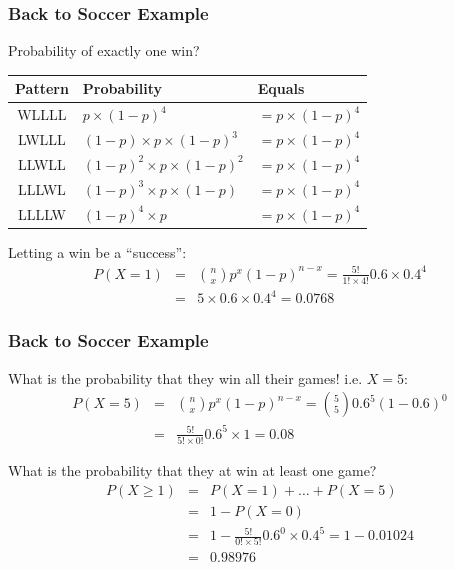 \documentclass[handout]{beamer}
\newcommand{\blue}[1]{\textcolor{blue2}{#1}}
\begin{document}
\begin{frame}
\frametitle{Back to Soccer Example}
Probability of exactly one win?

\begin{center}
\begin{tabular}{c|ll}
Pattern & Probability & Equals\\
\hline
\blue{WLLLL} & $p \times (1-p)^4$ & $=p\times(1-p)^4$\\
\blue{LWLLL} & $(1-p) \times p \times (1-p)^3$ & $=p\times(1-p)^4$\\
\blue{LLWLL} & $(1-p)^2 \times p \times (1-p)^2$& $=p\times(1-p)^4$\\
\blue{LLLWL} & $(1-p)^3 \times p \times (1-p)$& $=p\times(1-p)^4$\\
\blue{LLLLW} & $(1-p)^4 \times p$& $=p\times(1-p)^4$\\
\end{tabular} 
\end{center}

%
%
\pause Letting a win be a ``success'':
\begin{eqnarray*}
P(X=1) &=& {n \choose x} p^x (1-p)^{n-x} = \frac{5!}{1!\times4!} 0.6 \times 0.4^4\\
&=& 5 \times  0.6 \times 0.4^4 = 0.0768
\end{eqnarray*}

\end{frame}


\begin{frame}
\frametitle{Back to Soccer Example}
%
%
What is the probability that they win all their games!  i.e. $X=5$:
\pause \begin{eqnarray*}
P(X=5) &=& {n \choose x} p^x (1-p)^{n-x} = {5 \choose 5} 0.6^5 (1-0.6)^{0}\\
&=& \frac{5!}{5!\times 0!} 0.6^5 \times 1 = 0.08
\end{eqnarray*}

\vspace{0.75cm}

\pause What is the probability that they at win at least one game?
\pause \begin{eqnarray*}
P(X\geq 1) &=& P(X=1) + \ldots + P(X=5) \\
&=& 1 - P(X=0)\\
&=& 1 -  \frac{5!}{0!\times 5!} 0.6^0 \times 0.4^5 = 1 - 0.01024\\
&=& 0.98976
\end{eqnarray*}

\end{frame}
\end{document}
